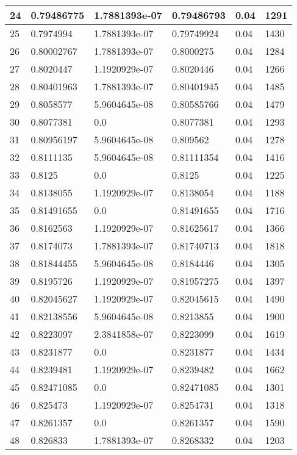 \begin{longtable}{|l|l|l|l|l|l|}
24 & 0.79486775 & 1.7881393e-07 & 0.79486793 & 0.04 & 1291 \\ \hline 
25 & 0.7974994 & 1.7881393e-07 & 0.79749924 & 0.04 & 1430 \\ \hline 
26 & 0.80002767 & 1.7881393e-07 & 0.8000275 & 0.04 & 1284 \\ \hline 
27 & 0.8020447 & 1.1920929e-07 & 0.8020446 & 0.04 & 1266 \\ \hline 
28 & 0.80401963 & 1.7881393e-07 & 0.80401945 & 0.04 & 1485 \\ \hline 
29 & 0.8058577 & 5.9604645e-08 & 0.80585766 & 0.04 & 1479 \\ \hline 
30 & 0.8077381 & 0.0 & 0.8077381 & 0.04 & 1293 \\ \hline 
31 & 0.80956197 & 5.9604645e-08 & 0.809562 & 0.04 & 1278 \\ \hline 
32 & 0.8111135 & 5.9604645e-08 & 0.81111354 & 0.04 & 1416 \\ \hline 
33 & 0.8125 & 0.0 & 0.8125 & 0.04 & 1225 \\ \hline 
34 & 0.8138055 & 1.1920929e-07 & 0.8138054 & 0.04 & 1188 \\ \hline 
35 & 0.81491655 & 0.0 & 0.81491655 & 0.04 & 1716 \\ \hline 
36 & 0.8162563 & 1.1920929e-07 & 0.81625617 & 0.04 & 1366 \\ \hline 
37 & 0.8174073 & 1.7881393e-07 & 0.81740713 & 0.04 & 1818 \\ \hline 
38 & 0.81844455 & 5.9604645e-08 & 0.8184446 & 0.04 & 1305 \\ \hline 
39 & 0.8195726 & 1.1920929e-07 & 0.81957275 & 0.04 & 1397 \\ \hline 
40 & 0.82045627 & 1.1920929e-07 & 0.82045615 & 0.04 & 1490 \\ \hline 
41 & 0.82138556 & 5.9604645e-08 & 0.8213855 & 0.04 & 1900 \\ \hline 
42 & 0.8223097 & 2.3841858e-07 & 0.8223099 & 0.04 & 1619 \\ \hline 
43 & 0.8231877 & 0.0 & 0.8231877 & 0.04 & 1434 \\ \hline 
44 & 0.8239481 & 1.1920929e-07 & 0.8239482 & 0.04 & 1662 \\ \hline 
45 & 0.82471085 & 0.0 & 0.82471085 & 0.04 & 1301 \\ \hline 
46 & 0.825473 & 1.1920929e-07 & 0.8254731 & 0.04 & 1318 \\ \hline 
47 & 0.8261357 & 0.0 & 0.8261357 & 0.04 & 1590 \\ \hline 
48 & 0.826833 & 1.7881393e-07 & 0.8268332 & 0.04 & 1203 \\ \hline 

\end{longtable}
